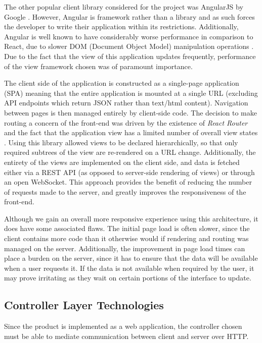 \documentclass{l4proj}
\begin{document}
        The other popular client library considered for the project was AngularJS by Google \cite{angular}. However, Angular is framework rather than a library and as such forces the developer to write their application within its restrictions. Additionally, Angular is well known to have considerably worse performance in comparison to React, due to slower DOM (Document Object Model) manipulation operations \cite{reactvsangular}. Due to the fact that the view of this application updates frequently, performance of the view framework chosen was of paramount importance.
        
    The client side of the application is constructed as a single-page application (SPA) meaning that the entire application is mounted at a single URL (excluding API endpoints which return JSON rather than text/html content). Navigation between pages is then managed entirely by client-side code. The decision to make routing a concern of the front-end was driven by the existence of \textit{React Router} and the fact that the application view has a limited number of overall view states \cite{reactrouter}. Using this library allowed views to be declared hierarchically, so that only required subtrees of the view are re-rendered on a URL change.
Additionally, the entirety of the views are implemented on the client side, and data is fetched either via a REST API (as opposed to server-side rendering of views) or through an open WebSocket. This approach provides the benefit of reducing the number of requests made to the server, and greatly improves the responsiveness of the front-end. 

Although we gain an overall more responsive experience using this architecture, it does have some associated flaws. The initial page load is often slower, since the client contains more code than it otherwise would if rendering and routing was managed on the server. Additionally, the improvement in page load times can place a burden on the server, since it has to ensure that the data will be available when a user requests it. If the data is not available when required by the user, it may prove irritating as they wait on certain portions of the interface to update.

\subsection{Controller Layer Technologies}
        
        Since the product is implemented as a web application, the controller chosen must be able to mediate communication between client and server over HTTP.
\end{document}
